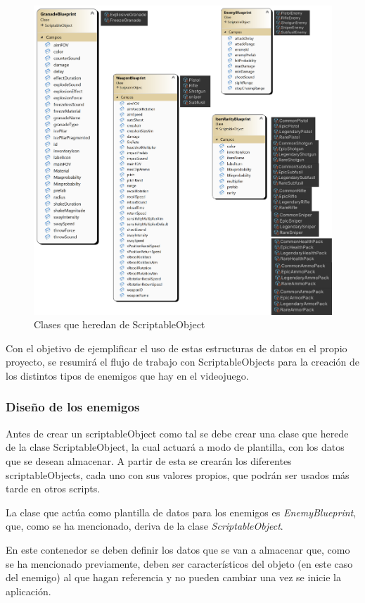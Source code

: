 \begin{figure}[h]
	\centering
	\includegraphics[scale=0.45]{img/Blueprints.png}
	\caption{Clases que heredan de ScriptableObject}
	\label{fig:ScriptableObjects}
    \end{figure}
    
Con el objetivo de ejemplificar el uso de estas estructuras de datos en el propio proyecto, se resumirá el flujo de trabajo con ScriptableObjects para la creación de los distintos tipos de enemigos que hay en el videojuego.

\subsubsection{Diseño de los enemigos}
Antes de crear un scriptableObject como tal se debe crear una clase que herede de la clase ScriptableObject, la cual actuará a modo de plantilla, con los datos que se desean almacenar. A partir de esta se crearán los diferentes scriptableObjects, cada uno con sus valores propios, que podrán ser usados más tarde en otros scripts.

La clase que actúa como plantilla de datos para los enemigos es \textit{EnemyBlueprint}, que, como se ha mencionado, deriva de la clase \textit{ScriptableObject}.

En este contenedor se deben definir los datos que se van a almacenar que, como se ha mencionado previamente, deben ser característicos del objeto (en este caso del enemigo) al que hagan referencia y no pueden cambiar una vez se inicie la aplicación.

